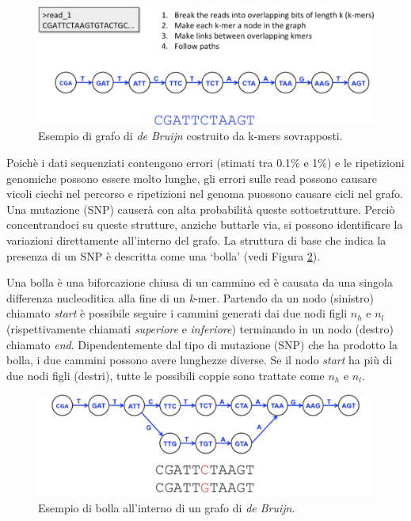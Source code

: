 \documentclass[../main.tex]{subfiles}
\begin{document}
\begin{figure}[h!]
	\centering
  	\captionsetup{justification=centering}
  	\includegraphics[scale=.3]{images/dBG.png}
  	\caption{Esempio di grafo di \textit{de Bruijn} costruito da k-mers sovrapposti.}
  	\label{fig:dBG}
\end{figure}

\noindent
Poichè i dati sequenziati contengono errori (stimati tra 0.1\% e 1\%) e le ripetizioni genomiche possono essere molto lunghe, gli errori sulle read possono causare vicoli ciechi nel percorso e ripetizioni nel genoma puossono causare cicli nel grafo. Una mutazione (SNP) causerà con alta probabilità queste sottostrutture. Perciò concentrandoci su queste strutture, anziche buttarle via, si possono identificare la variazioni direttamente all'interno del grafo. La struttura di base che indica la presenza di un SNP è descritta come una `bolla' (vedi Figura \ref{fig:dBG_bubble}).

\begin{definition}
\label{def:dBG_bubble}
Una bolla è una biforcazione chiusa di un cammino ed è causata da una singola differenza nucleoditica alla fine di un \textit{k}-mer. Partendo da un nodo (sinistro) chiamato \textit{start} è possibile seguire i cammini generati dai due nodi figli $n_h$ e $n_l$ (rispettivamente chiamati \textit{superiore} e \textit{inferiore}) terminando in un nodo (destro) chiamato \textit{end}. Dipendentemente dal tipo di mutazione (SNP) che ha prodotto la bolla, i due cammini possono avere lunghezze diverse. Se il nodo \textit{start} ha più di due nodi figli (destri), tutte le possibili coppie sono trattate come $n_h$ e $n_l$.
\end{definition}

\begin{figure}[h!]
	\centering
  	\captionsetup{justification=centering}
  	\includegraphics[scale=.3]{images/dBG_bubble.png}
  	\caption{Esempio di bolla all'interno di un grafo di \textit{de Bruijn}.}
  	\label{fig:dBG_bubble}
\end{figure}
\end{document}
